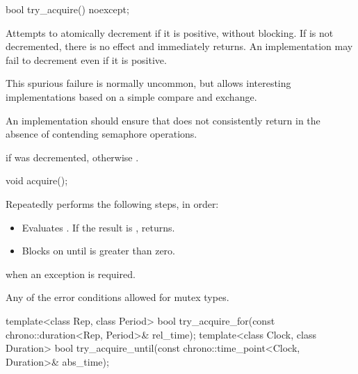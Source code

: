 %
\begin{itemdecl}
bool try_acquire() noexcept;
\end{itemdecl}

\begin{itemdescr}
\pnum
\effects
Attempts to atomically decrement  if it is positive,
without blocking.
If  is not decremented, there is no effect and
 immediately returns.
An implementation may fail to decrement 
even if it is positive.
\begin{note}
This spurious failure is normally uncommon, but
allows interesting implementations
based on a simple compare and exchange.
\end{note}
An implementation should ensure that 
does not consistently return 
in the absence of contending semaphore operations.

\pnum
\returns
{} if  was decremented, otherwise .
\end{itemdescr}

%
\begin{itemdecl}
void acquire();
\end{itemdecl}

\begin{itemdescr}
\pnum
\effects
Repeatedly performs the following steps, in order:
\begin{itemize}
\item Evaluates . If the result is , returns.
\item
{}%
Blocks on  until  is greater than zero.
\end{itemize}

\pnum
\throws
{} when an exception is required.

\pnum
\errors
Any of the error conditions
allowed for mutex types.
\end{itemdescr}

%
%
\begin{itemdecl}
template<class Rep, class Period>
  bool try_acquire_for(const chrono::duration<Rep, Period>& rel_time);
template<class Clock, class Duration>
  bool try_acquire_until(const chrono::time_point<Clock, Duration>& abs_time);
\end{itemdecl}


